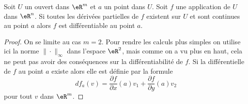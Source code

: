 \begin{proposition}		\label{Diff_totale}
 Soit $U$ un ouvert dans $\eR^m$ et $a$ un point dans $U$. Soit $f$ une application de $U$ dans $\eR^n$. Si toutes les dérivées partielles de $f$ existent sur \( U\) et sont continues au point $a$ alors $f$ est différentiable au point $a$.
\end{proposition}
\begin{proof} 
 On se limite au cas $m=2$.  Pour rendre les calculs plus simples on utilise ici la norme $\|\cdot\|_\infty$ dans l'espace $\eR^2$, mais comme on a vu plus en haut, cela ne peut pas avoir des conséquences sur la différentiabilité de $f$. Si la différentielle de $f$ au point $a$ existe alors elle est définie par la formule
\[
    df_a(v)=\frac{ \partial f }{ \partial x }(a)v_1+\frac{ \partial f }{ \partial y }(a)v_2
\] 
pour tout $v$ dans $\eR^m$. 


\end{proof}
